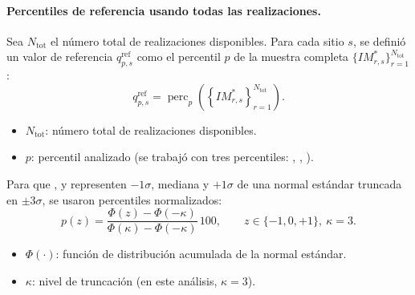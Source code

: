 \paragraph{Percentiles de referencia usando todas las realizaciones.}
Sea $N_{\mathrm{tot}}$ el número total de realizaciones disponibles. Para cada sitio $s$, se definió un valor de referencia $q^{\mathrm{ref}}_{p,s}$ como el percentil $p$ de la muestra completa $\{IM^\ast_{r,s}\}_{r=1}^{N_{\mathrm{tot}}}$:
\begin{equation}
q^{\mathrm{ref}}_{p,s}=\operatorname{perc}_{p}\!\left(\left\{IM^\ast_{r,s}\right\}_{r=1}^{N_{\mathrm{tot}}}\right).
\end{equation}
\begin{itemize}
  \item $N_{\mathrm{tot}}$: número total de realizaciones disponibles.
  \item $p$: percentil analizado (se trabajó con tres percentiles: \pSixteen{}, \pFifty{}, \pEightyFour{}).
\end{itemize}

Para que \pSixteen{}, \pFifty{} y \pEightyFour{} representen $-1\sigma$, mediana y $+1\sigma$ de una normal estándar truncada en $\pm 3\sigma$, se usaron percentiles normalizados:
\begin{equation}
p(z)=\frac{\Phi(z)-\Phi(-\kappa)}{\Phi(\kappa)-\Phi(-\kappa)}\,100,
\qquad z\in\{-1,0,+1\},\ \kappa=3.
\end{equation}
\begin{itemize}
  \item $\Phi(\cdot)$: función de distribución acumulada de la normal estándar.
  \item $\kappa$: nivel de truncación (en este análisis, $\kappa=3$).
\end{itemize}

